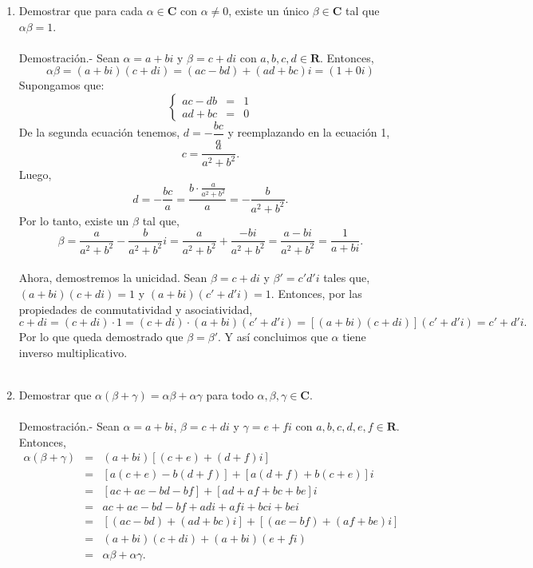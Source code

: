 \begin{enumerate}[\bfseries 1.]
    \item Demostrar que para cada $\alpha \in \textbf{C}$ con $\alpha\neq 0$, existe un único $\beta\in \textbf{C}$ tal que $\alpha\beta=1$.\\\\
	Demostración.-\; Sean $\alpha=a+bi$ y $\beta=c+di$ con $a,b,c,d\in \textbf{R}$. Entonces,
	$$\alpha\beta = (a+bi)(c+di) = (ac-bd)+(ad+bc)i=(1+0i)$$
	Supongamos que:
	$$\left\{\begin{array}{rcl}
	    ac-db & = & 1\\
	    ad+bc & = & 0
	\end{array}\right.$$
	De la segunda ecuación tenemos, $d=-\dfrac{bc}{a}$ y reemplazando en la ecuación 1, 
	$$c=\dfrac{a}{a^2+b^2}.$$
	Luego,
	$$d=-\dfrac{bc}{a}=\dfrac{b\cdot \frac{a}{a^2+b^2}}{a}=-\dfrac{b}{a^2+b^2}.$$
	Por lo tanto, existe un $\beta$ tal que,
	$$\beta=\dfrac{a}{a^2+b^2}-\dfrac{b}{a^2+b^2}i=\dfrac{a}{a^2+b^2}+\dfrac{-bi}{a^2+b^2}=\dfrac{a-bi}{a^2+b^2}=\dfrac{1}{a+bi}.$$\\
	Ahora, demostremos la unicidad. Sean $\beta=c+di$ y $\beta'=c'd'i$ tales que, $(a+bi)(c+di)=1$ y $(a+bi)(c'+d'i)=1$. Entonces, por las propiedades de conmutatividad y asociatividad,
	$$c+di=(c+di)\cdot 1 = (c+di)\cdot(a+bi)(c'+d'i)=\left[(a+bi)(c+di)\right](c'+d'i)=c'+d'i.$$
	Por lo que queda demostrado que $\beta=\beta'.$ Y así concluimos que $\alpha$ tiene inverso multiplicativo.\\\\



    \item Demostrar que $\alpha(\beta+\gamma)=\alpha\beta+\alpha\gamma$ para todo $\alpha,\beta,\gamma\in \textbf{C}$.\\\\
	Demostración.-\; Sean $\alpha=a+bi$, $\beta=c+di$ y $\gamma=e+fi$ con $a,b,c,d,e,f\in \textbf{R}$. Entonces,
$$\begin{array}{rcl}
    \alpha(\beta+\gamma) & = & (a+bi)\left[(c+e)+(d+f)i\right]\\
			 & = & \left[a(c+e)-b(d+f)\right]+\left[a(d+f)+b(c+e)\right]i\\
			 & = & \left[ac+ae-bd-bf\right]+\left[ad+af+bc+be\right]i\\
			 & = & ac+ae-bd-bf+adi+afi+bci+bei\\
			 & = & \left[(ac-bd)+(ad+bc)i\right] + \left[(ae-bf)+(af+be)i\right]\\
			 & = & (a+bi)(c+di)+(a+bi)(e+fi)\\
			 & = & \alpha\beta + \alpha\gamma.
\end{array}$$
\vspace{0.5cm}


\end{enumerate}
